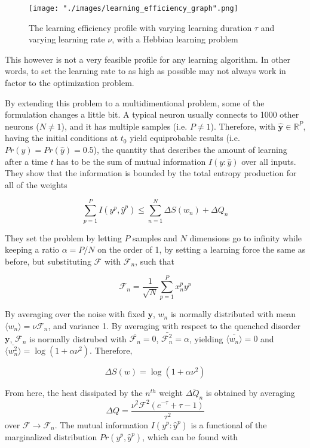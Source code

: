 \begin{figure}[ht]
\begin{center}
    \texttt{[image: "./images/learning\_efficiency\_graph".png]}
    \caption{The learning efficiency profile with varying learning duration $\tau$ and varying learning rate $\nu$, with a Hebbian learning problem}
    \label{fig::learning_efficiency}
\end{center}
\end{figure}

This however is not a very feasible profile for any learning algorithm. In other words, to set the learning rate to as high as possible may not always work in factor to the optimization problem.

By extending this problem to a multidimentional problem, some of the formulation changes a little bit. A typical neuron usually connects to 1000 other neurons ($N\neq 1$), and it has multiple samples (i.e. $P\neq 1$). Therefore, with $\hat{\bm{y}} \in \mathbb{R}^{P}$, having the initial conditions at $t_0$ yield equiprobable results (i.e. $Pr(y) = Pr(\hat{y}) = 0.5$), the quantity that describes the amount of learning after a time $t$ has to be the sum of mutual information $I(y:\hat{y})$ over all inputs. They show that the information is bounded by the total entropy production for all of the weights

$$\sum_{p=1}^P I(y^p,\hat{y}^p) \leq \sum_{n=1}^N \Delta S(w_n) + \Delta Q_n $$

They set the problem by letting $P$ samples and $N$ dimensions go to infinity while keeping a ratio $\alpha = P/N$ on the order of 1, by setting a learning force the same as before, but substituting $\mathcal{F}$ with $\mathcal{F}_n$, such that

$$\mathcal{F}_n = \frac{1}{\sqrt{N}} \sum_{p=1}^P x^p_n y^p $$

By averaging over the noise with fixed $\bm{y}$, $w_n$ is normally distributed with mean $\langle w_n \rangle = \nu \mathcal{F}_n$, and variance 1. By averaging with respect to the quenched disorder $\bm{y}$, $\mathcal{F}_n$ is normally distrubed with $\bar{\mathcal{F}_n} = 0$, $\bar{\mathcal{F}_n^2} = \alpha$, yielding $\bar{\langle w_n \rangle} = 0$ and $\bar{\langle w_n^2 \rangle} = \log(1+ \alpha \nu^2)$. Therefore,

$$\Delta S (w) = \log(1+\alpha \nu ^2)$$

From here, the heat dissipated by the $n^{th}$ weight $\bar{\Delta Q_n}$ is obtained by averaging
$$\Delta Q = \frac{\nu^2 \mathcal{F}^2 ( e^{-\tau} + \tau - 1 )}{\tau ^2}$$
 over $\mathcal{F} \rightarrow \mathcal{F}_n$. The mutual information $I(y^p:\hat{y}^p)$ is a functional of the marginalized distribution $Pr(y^p,\hat{y}^p)$, which can be found with

